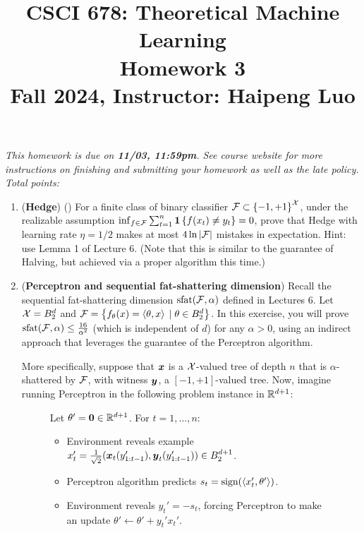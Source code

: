 \documentclass{article}
\title{CSCI 678: Theoretical Machine Learning \\ Homework 3 \\ {\small Fall 2024, Instructor: Haipeng Luo}}
\begin{document}
\maketitle

\textit{This homework is due on {\bf 11/03, 11:59pm}. 
See course website for more instructions on finishing and submitting your homework as well as the late policy. Total points: }\\


\begin{enumerate}[leftmargin=*,align=left]
\item
({\bf Hedge}) () 
For a finite class of binary classifier ${\mathcal{F}} \subset \left\{-1,+1\right\}^{\mathcal{X}}$,
under the realizable assumption $\inf_{f\in{\mathcal{F}}} \sum_{t=1}^n \boldsymbol{1}\left\{f(x_t) \neq y_t\right\} = 0$,
prove that Hedge with learning rate $\eta=1/2$ makes at most $4\ln|{\mathcal{F}}|$ mistakes in expectation. 
Hint: use Lemma 1 of Lecture 6.
(Note that this is similar to the guarantee of Halving, but achieved via a proper algorithm this time.)

\newpage
\item 
({\bf Perceptron and sequential fat-shattering dimension})
Recall the sequential fat-shattering dimension ${\text{\rm sfat}}({\mathcal{F}}, \alpha)$ defined in Lectures 6.
Let ${\mathcal{X}} = B^d_2$ and ${\mathcal{F}} = \left\{f_\theta(x) = \left\langle \theta,x \right\rangle \;|\; \theta \in B^d_2\right\}$.
In this exercise, you will prove ${\text{\rm sfat}}({\mathcal{F}}, \alpha) \leq \frac{16}{\alpha^2}$ (which is independent of $d$) for any $\alpha > 0$, using an indirect approach that leverages the guarantee of the Perceptron algorithm.

More specifically, suppose that ${\boldsymbol{x}}$ is a ${\mathcal{X}}$-valued tree of depth $n$ that is $\alpha$-shattered by ${\mathcal{F}}$, with witness ${\boldsymbol{y}}$, a $[-1,+1]$-valued tree.
Now, imagine running Perceptron in the following problem instance in $\mathbb{R}^{d+1}$:

\begin{figure}[H]
\begin{framed}
Let $\theta' = {\boldsymbol{0}} \in \mathbb{R}^{d+1}$. For $t = 1, \ldots, n$:
\begin{itemize}
\item Environment reveals example $x'_t = \frac{1}{\sqrt{2}}({\boldsymbol{x}}_t(y'_{1:t-1}), {\boldsymbol{y}}_t(y'_{1:t-1})) \in B_2^{d+1}$.

\item Perceptron algorithm predicts $s_t = {\text{\rm sign}}(\left\langle x_t',\theta' \right\rangle)$.

\item Environment reveals $y_t' = -s_t$, forcing Perceptron to make an update $\theta' \leftarrow \theta' + y_t' x_t'$.
\end{itemize}
\end{framed}
\end{figure}


\end{enumerate}
\end{document}
